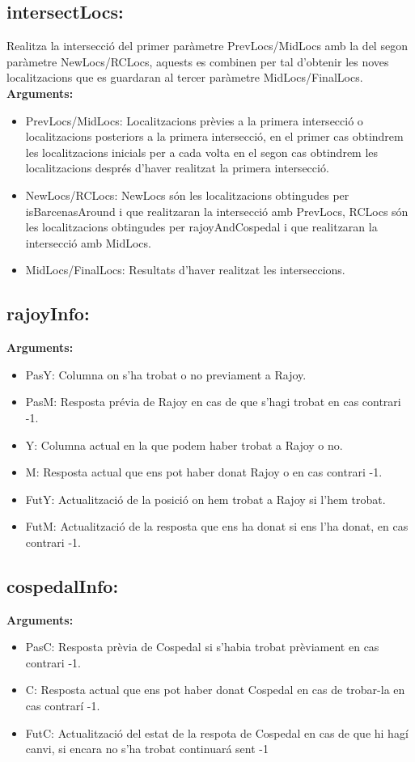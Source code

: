 \documentclass[11pt]{article}
\begin{document}
\subsection{intersectLocs:}
Realitza la intersecció del primer paràmetre PrevLocs/MidLocs amb la del segon paràmetre NewLocs/RCLocs, aquests es combinen per tal d'obtenir les noves localitzacions que es guardaran al tercer paràmetre MidLocs/FinalLocs.\\
\textbf{Arguments:}
\begin{itemize}
\item PrevLocs/MidLocs: Localitzacions prèvies a la primera intersecció o localitzacions posteriors a la primera intersecció, en el primer cas obtindrem les localitzacions inicials per a cada volta en el segon cas obtindrem les localitzacions després d'haver realitzat la primera intersecció.
\item NewLocs/RCLocs: NewLocs són les localitzacions obtingudes per isBarcenasAround i que realitzaran la intersecció amb PrevLocs, RCLocs són les localitzacions obtingudes per rajoyAndCospedal i que realitzaran la intersecció amb MidLocs.
\item MidLocs/FinalLocs: Resultats d'haver realitzat les interseccions.
\end{itemize}
\subsection{rajoyInfo:}
\textbf{Arguments:}
\begin{itemize}
\item PasY: Columna on s'ha trobat o no previament a Rajoy.
\item PasM: Resposta prévia de Rajoy en cas de que s'hagi trobat en cas contrari -1.
\item Y: Columna actual en la que podem haber trobat a Rajoy o no.
\item M: Resposta actual que ens pot haber donat Rajoy o en cas contrari -1.
\item FutY: Actualització de la posició on hem trobat a Rajoy si l'hem trobat.
\item FutM: Actualització de la resposta que ens ha donat si ens l'ha donat, en cas contrari -1.
\end{itemize}
\subsection{cospedalInfo:}
\textbf{Arguments:}
\begin{itemize}
\item PasC: Resposta prèvia de Cospedal si s'habia trobat prèviament en cas contrari -1.
\item C: Resposta actual que ens pot haber donat Cospedal en cas de trobar-la en cas contrarí -1.
\item FutC: Actualització del estat de la respota de Cospedal en cas de que hi hagí canvi, si encara no s'ha trobat continuará sent -1
\end{itemize}
\end{document}

